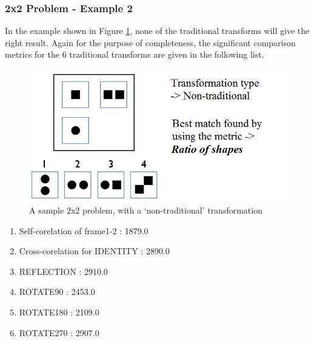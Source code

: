 \documentclass[10pt, letter]{article}
\begin{document}
\subsubsection*{2x2 Problem - Example 2}
In the example shown in Figure \ref{fig10}, none of the traditional transforms will give the right result. Again for the purpose of completeness, the significant comparison metrics for the 6 traditional transforms are given in the following list.

\begin{figure}[h!]
  \centering
    \includegraphics[scale = 0.5]{Images/Fig10}
    \caption{A sample 2x2 problem, with a `non-traditional' transformation}
  \label{fig10}
\end{figure}

\begin{enumerate}
	\item Self-corelation of frame1-2 : 1879.0
	\item Cross-corelation for IDENTITY : 2890.0
	\item REFLECTION : 2910.0
	\item ROTATE90 : 2453.0
	\item ROTATE180 : 2109.0
	\item ROTATE270 : 2907.0
\end{enumerate}
\end{document}
